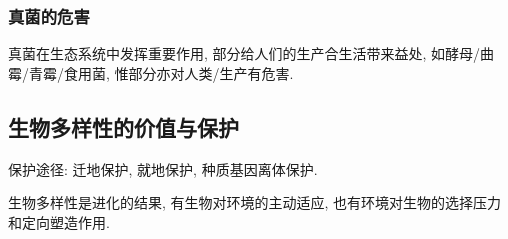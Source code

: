 \documentclass{ctexart}
\begin{document}

\subsubsection{真菌的危害} %
\label{ssub:真菌的危害}

真菌在生态系统中发挥重要作用, 部分给人们的生产合生活带来益处, 如酵母/曲霉/青霉/食用菌, 惟部分亦对人类/生产有危害.



\subsection{生物多样性的价值与保护} %
\label{sub:生物多样性的价值与保护}

保护途径: 迁地保护, 就地保护, 种质基因离体保护.
\par
生物多样性是进化的结果, 有生物对环境的主动适应, 也有环境对生物的选择压力和定向塑造作用.


\end{document}
